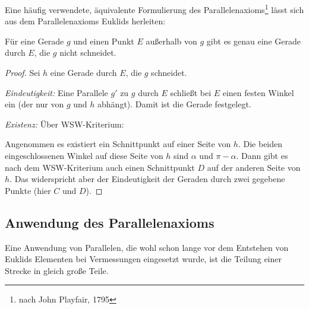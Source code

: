 
Eine häufig verwendete, äquivalente Formulierung des Parallelenaxioms\footnote{nach John Playfair,
1795} lässt sich aus dem Parallelenaxioms Euklids herleiten:

\begin{thm}
    Für eine Gerade $g$ und einen Punkt $E$ außerhalb von $g$ gibt es genau eine Gerade durch $E$,
    die $g$ nicht schneidet.
\end{thm}


\begin{proof}
Sei $h$ eine Gerade durch $E$, die $g$ schneidet. %

{\em Eindeutigkeit:} Eine Parallele $g'$ zu $g$ durch $E$ schließt bei $E$ einen festen Winkel ein
(der nur von $g$ und $h$ abhängt). Damit ist die Gerade festgelegt.

{\em Existenz:} Über WSW-Kriterium:

Angenommen es existiert ein Schnittpunkt auf einer Seite von $h$. Die beiden eingeschlossenen
Winkel auf diese Seite von $h$ sind $\alpha$ und $\pi-\alpha$. Dann gibt es nach dem WSW-Kriterium
auch einen Schnittpunkt $D$ auf der anderen Seite von $h$. Das widerspricht aber der Eindeutigkeit
der Geraden durch zwei gegebene Punkte (hier $C$ und $D$).
\end{proof}

\subsection*{Anwendung des Parallelenaxioms}

Eine Anwendung von Parallelen, die wohl schon lange vor dem Entstehen von Euklids Elementen bei
Vermessungen eingesetzt wurde, ist die Teilung einer Strecke in gleich große Teile.

